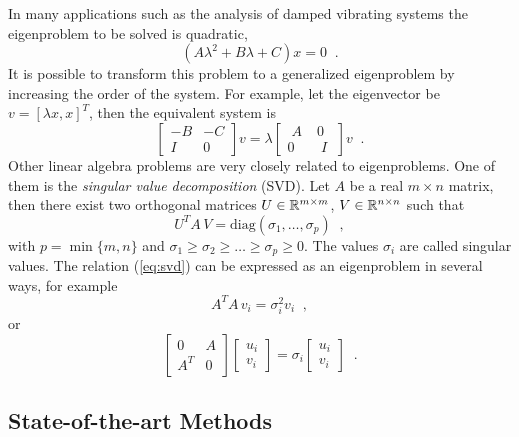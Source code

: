 	In many applications such as the analysis of damped vibrating systems the eigenproblem to be solved is quadratic,
\begin{equation}(A\lambda^2+B\lambda+C)x=0\;\;.\label{eq:eigcuad}\end{equation}
It is possible to transform this problem to a generalized eigenproblem by increasing the order of the system. For example, let the eigenvector be $v=[\lambda x, x]^T$, then the equivalent system is
\begin{equation}
\label{eq:quad}
\left[\begin{array}{cc}-B & -C\\I & 0\end{array}\right]v=\lambda\left[\begin{array}{cc}\;A\; & 0\\0 & \;I\;\end{array}\right]v\;\;.
\end{equation}
	Other linear algebra problems are very closely related to eigenproblems. One of them is the {\em singular value decomposition\/} (SVD). Let $A$ be a real $m\times n$ matrix, then there exist two orthogonal matrices $U\in\mathbb{R}^{m\times m}$, $V\in\mathbb{R}^{n\times n}$ such that
\begin{equation}
\label{eq:svd}
U^T\!A\,V=\mathrm{diag}(\sigma_1,\ldots,\sigma_p)\;\;,
\end{equation}
with $p=\min\{m,n\}$ and $\sigma_1\geq\sigma_2\geq\ldots\geq\sigma_p\geq 0$. The values $\sigma_i$ are called singular values. The relation (\ref{eq:svd}) can be expressed as an eigenproblem in several ways, for example
\begin{equation}
\label{eq:svdata}
A^T\!A\,v_i=\sigma_i^2v_i\;\;,
\end{equation}
or
\begin{equation}
\label{eq:svd2}
\left[\begin{array}{cc}0&A\\A^T&0\end{array}\right]
\left[\begin{array}{c}u_i\\v_i\end{array}\right]=\sigma_i
\left[\begin{array}{c}u_i\\v_i\end{array}\right]\;\;.
\end{equation}

\subsection{State-of-the-art Methods}

